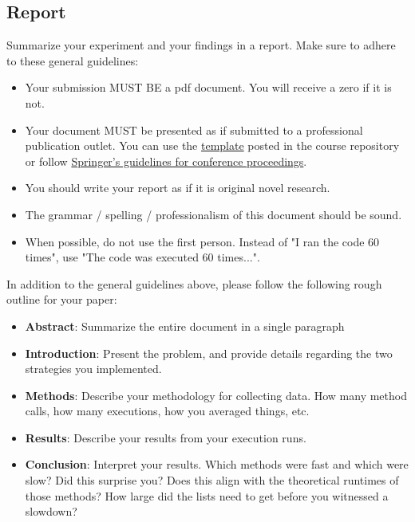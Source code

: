 \documentclass[paper=a4, fontsize=11pt, parskip=full]{scrartcl} %
\numberwithin{equation}{section} %
\numberwithin{figure}{section} %
\numberwithin{table}{section} %
\begin{document}
\subsection{Report}

Summarize your experiment and your findings in a report. Make sure to adhere to these general guidelines:

\begin{itemize}
	\item Your submission MUST BE a pdf document. You will receive a zero if it is not.
	\item Your document MUST be presented as if submitted to a professional publication outlet. You can use the \href{https://github.com/markfloryan/dsa1/blob/master/labs/WordPaperTemplate.zip}{template} posted in the course repository or follow \href{https://www.springer.com/us/computer-science/lncs/conference-proceedings-guidelines}{Springer's guidelines for conference proceedings}.
	\item You should write your report as if it is original novel research.
	\item The grammar / spelling / professionalism of this document should be sound.
	\item When possible, do not use the first person. Instead of "I ran the code 60 times", use "The code was executed 60 times...".
\end{itemize}

In addition to the general guidelines above, please follow the following rough outline for your paper:

\begin{itemize}
	\item \textbf{Abstract}: Summarize the entire document in a single paragraph
	\item \textbf{Introduction}: Present the problem, and provide details regarding the two strategies you implemented.
	\item \textbf{Methods}: Describe your methodology for collecting data. How many method calls, how many executions, how you averaged things, etc.
	\item \textbf{Results}: Describe your results from your execution runs.
	\item \textbf{Conclusion}: Interpret your results. Which methods were fast and which were slow? Did this surprise you? Does this align with the theoretical runtimes of those methods? How large did the lists need to get before you witnessed a slowdown?
\end{itemize}
\end{document}
